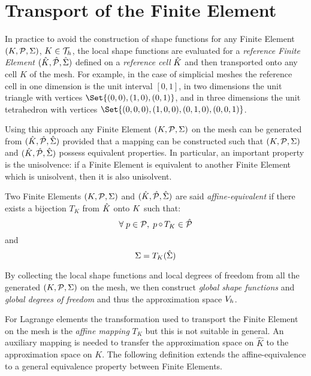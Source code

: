 \section{Transport of the Finite Element}

In practice to avoid the construction of shape functions for any Finite Element ${({K},{\mathcal P}, {\Sigma})}$, $K \in {\mathcal T}_h$, the local shape functions are evaluated for a \textit{reference Finite Element} ${({\hat {{K}}},{\hat {{\mathcal P}}}, {\hat{{\Sigma}}})}$ defined on a \textit{reference cell} ${\hat {{K}}}$ and then transported onto any cell $K$ of the mesh.
For example, in the case of simplicial meshes the reference cell in one dimension is the unit interval $[0,1]$, in two dimensions the unit triangle with vertices $\Set{(0,0),(1,0),(0,1)}$, and in three dimensions the unit tetrahedron with vertices $\Set{(0,0,0),(1,0,0),(0,1,0),(0,0,1)}$.

\medskip
Using this approach any Finite Element ${({K},{\mathcal P}, {\Sigma})}$ on the mesh can be generated from ${({\hat {{K}}},{\hat {{\mathcal P}}}, {\hat{{\Sigma}}})}$ provided that a mapping can be constructed such that ${({K},{\mathcal P}, {\Sigma})}$ and ${({\hat {{K}}},{\hat {{\mathcal P}}}, {\hat{{\Sigma}}})}$ possess equivalent properties.
In particular, an important property is the unisolvence: if a Finite Element is equivalent to another Finite Element which is unisolvent, then it is also unisolvent.

\begin{dfntn}
Two Finite Elements ${({K},{\mathcal P}, {\Sigma})}$ and ${({\hat {{K}}},{\hat {{\mathcal P}}}, {\hat{{\Sigma}}})}$ are said \textit{affine-equivalent} if there exists a bijection $T_K$ from ${\hat {{K}}}$ onto ${K}$  such that:
\begin{equation*}
{\forall\;} p \in {\mathcal P},\; p\mathop\circ T_K \in {\hat {{\mathcal P}}}
\end{equation*}
and
\begin{equation*}
\Sigma = T_K({\hat{{\Sigma}}})
\end{equation*}
\end{dfntn}

\medskip
By collecting the local shape functions and local degrees of freedom from all the generated ${({K},{\mathcal P}, {\Sigma})}$ on the mesh, we then construct \textit{global shape functions} and \textit{global degrees of freedom} and thus the approximation space ${{V}}_h$.

\medskip
For Lagrange elements the transformation used to transport the Finite Element on the mesh is the \textit{affine mapping} $T_K$ but this is not suitable in general.
An auxiliary mapping is needed to transfer the approximation space on $\hat K$ to the approximation space on $K$.
The following definition extends the affine-equivalence to a general equivalence property between Finite Elements.

